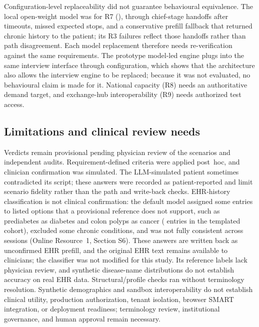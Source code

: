 Configuration-level replaceability did not guarantee behavioural equivalence. The
local open-weight model was \EThreeLocalSwapVerdict{} for R7 (\RSevenFailingScripts{}),
through chief-stage handoffs after timeouts, missed expected stops, and a
conservative prefill fallback that returned chronic history to the patient; its R3
failures reflect those handoffs rather than path disagreement. Each model
replacement therefore needs re-verification against the same requirements.
The prototype model-led engine plugs into the same interview interface through
configuration, which shows that the architecture also allows the interview engine
to be replaced; because it was not evaluated, no behavioural claim is made for it.
National capacity (R8) needs an authoritative demand target, and exchange-hub
interoperability (R9) needs authorized test access.

\subsection{Limitations and clinical review needs}
Verdicts remain provisional pending physician review of the scenarios and
independent audits. Requirement-defined criteria were applied post~hoc, and
clinician confirmation was simulated. The LLM-simulated patient sometimes
contradicted its script; these answers were recorded as patient-reported and limit
scenario fidelity rather than the path and write-back checks. EHR-history
classification is not clinical confirmation: the default model assigned some
entries to listed options that a provisional reference does not support, such as
prediabetes as diabetes and colon polyps as cancer
(\EOnePrefillListedDisagree{} entries in the templated cohort), excluded some
chronic conditions, and was not fully consistent across sessions (Online
Resource~1, Section S6). These answers are written back as unconfirmed EHR prefill,
and the original EHR text remains available to clinicians; the classifier was not
modified for this study. Its reference labels lack physician review, and synthetic
disease-name distributions do not establish accuracy on real EHR data.
Structural/profile checks ran without terminology resolution. Synthetic
demographics and sandbox interoperability do not establish clinical utility,
production authorization, tenant isolation, browser SMART integration, or
deployment readiness; terminology review, institutional governance, and human
approval remain necessary.

